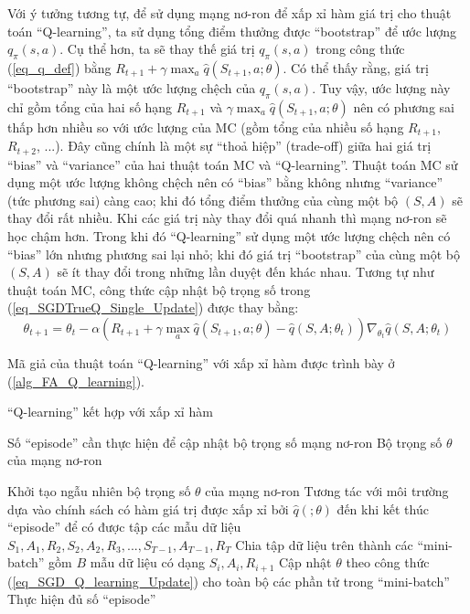 	Với ý tưởng tương tự, để sử dụng mạng nơ-ron để xấp xỉ hàm giá trị cho thuật toán ``Q-learning'', ta sử dụng tổng điểm thưởng được ``bootstrap'' để ước lượng $q_{\pi}(s,a)$.
	Cụ thể hơn, ta sẽ thay thế giá trị $q_{\pi}(s,a)$ trong công thức (\ref{eq_q_def}) bằng $R_{t+1}+ \gamma \max_{a}\hat{q}(S_{t+1}, a;\theta)$.
	Có thể thấy rằng, giá trị ``bootstrap'' này là một ước lượng chệch của $q_{\pi}(s,a)$.
	Tuy vậy, ước lượng này chỉ gồm tổng của hai số hạng $R_{t+1}$ và $\gamma \max_{a}\hat{q}(S_{t+1}, a;\theta)$ nên có phương sai thấp hơn nhiều so với ước lượng của MC (gồm tổng của nhiều số hạng $R_{t+1}$, $R_{t+2}$, ...).
	Đây cũng chính là một sự ``thoả hiệp'' (trade-off) giữa hai giá trị ``bias'' và ``variance'' của hai thuật toán MC và ``Q-learning''.
	Thuật toán MC sử dụng một ước lượng không chệch nên có ``bias'' bằng không nhưng ``variance'' (tức phương sai) càng cao; khi đó tổng điểm thưởng của cùng một bộ $(S, A)$ sẽ thay đổi rất nhiều.
	Khi các giá trị này thay đổi quá nhanh thì mạng nơ-ron sẽ học chậm hơn.
	Trong khi đó ``Q-learning'' sử dụng một ước lượng chệch nên có ``bias'' lớn nhưng phương sai lại nhỏ; khi đó giá trị ``bootstrap'' của cùng một bộ $(S, A)$ sẽ ít thay đổi trong những lần duyệt đến khác nhau.
	Tương tự như thuật toán MC, công thức cập nhật bộ trọng số trong (\ref{eq_SGDTrueQ_Single_Update}) được thay bằng:
	\begin{equation}
		\label{eq_SGD_Q_learning_Update}
		\theta_{t+1} = \theta_t - \alpha (R_{t+1} + \gamma \max_{a}\hat{q}(S_{t+1}, a;\theta) - \hat{q}(S,A;\theta_t)) \nabla_{\theta_t} \hat{q}(S, A;\theta_t)	
	\end{equation}
	
	Mã giả của thuật toán ``Q-learning'' với xấp xỉ hàm được trình bày ở (\ref{alg_FA_Q_learning}).
	\begin{algorithm}
		\caption{``Q-learning'' kết hợp với xấp xỉ hàm}
		\label{alg_FA_Q_learning}
		\begin{algorithmic}[1]
			\renewcommand{\algorithmicrequire}{\textbf{Đầu vào:}}
			\renewcommand{\algorithmicensure}{\textbf{Đầu ra:}}
			\algnewcommand{}
			\algnewcommand\Operation{\item[\algorithmicoperation]}
			
			\Require Số ``episode'' cần thực hiện để cập nhật bộ trọng số mạng nơ-ron
			\Ensure Bộ trọng số $\theta$ của mạng nơ-ron
			
			\Operation
			\State Khởi tạo ngẫu nhiên bộ trọng số $\theta$ của mạng nơ-ron
			\Repeat
				\State Tương tác với môi trường dựa vào chính sách có hàm giá trị được xấp xỉ bởi $\hat{q}(;\theta)$ đến khi kết thúc ``episode'' để có được tập các mẫu dữ liệu $S_1, A_1, R_2, S_2, A_2, R_3, ..., S_{T-1}, A_{T-1}, R_{T}$
				\State Chia tập dữ liệu trên thành các ``mini-batch'' gồm $B$ mẫu dữ liệu có dạng $S_i, A_i, R_{i+1}$
					\State Cập nhật $\theta$ theo công thức (\ref{eq_SGD_Q_learning_Update}) cho toàn bộ các phần tử trong ``mini-batch''
				\EndFor
			\Until Thực hiện đủ số ``episode''
		\end{algorithmic}
	\end{algorithm}
	
